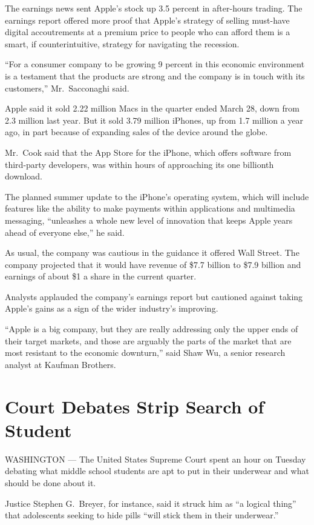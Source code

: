 \documentclass[12pt,a4paper,onecolumn]{article}
\begin{document}
The earnings news sent Apple's stock up 3.5 percent in after-hours trading. The earnings report
offered more proof that Apple's strategy of selling must-have digital accoutrements at a premium
price to people who can afford them is a smart, if counterintuitive, strategy for navigating the
recession.

``For a consumer company to be growing 9 percent in this economic environment is a testament that
the products are strong and the company is in touch with its customers,'' Mr.~Sacconaghi said.

Apple said it sold 2.22 million Macs in the quarter ended March 28, down from 2.3 million last year.
But it sold 3.79 million iPhones, up from 1.7 million a year ago, in part because of expanding sales
of the device around the globe.

Mr.~Cook said that the App Store for the iPhone, which offers software from third-party developers,
was within hours of approaching its one billionth download.

The planned summer update to the iPhone's operating system, which will include features like the
ability to make payments within applications and multimedia messaging, ``unleashes a whole new level
of innovation that keeps Apple years ahead of everyone else,'' he said.

As usual, the company was cautious in the guidance it offered Wall Street. The company projected
that it would have revenue of \$7.7 billion to \$7.9 billion and earnings of about \$1 a share in
the current quarter.

Analysts applauded the company's earnings report but cautioned against taking Apple's gains as a
sign of the wider industry's improving.

``Apple is a big company, but they are really addressing only the upper ends of their target
markets, and those are arguably the parts of the market that are most resistant to the economic
downturn,'' said Shaw Wu, a senior research analyst at Kaufman Brothers.

\section{Court Debates Strip Search of Student}

WASHINGTON — The United States Supreme Court spent an hour on Tuesday debating what middle school
students are apt to put in their underwear and what should be done about it.

Justice Stephen G.~Breyer, for instance, said it struck him as ``a logical thing'' that adolescents
seeking to hide pills ``will stick them in their underwear.''
\end{document}
